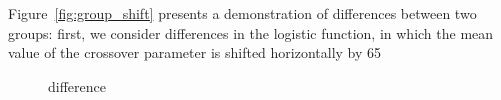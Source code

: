 \documentclass{article}
\begin{document}
Figure~\ref{fig:group_shift} presents a demonstration of differences between two groups: first, we consider differences in the logistic function, in which the mean value of the crossover parameter is shifted horizontally by 65

\begin{figure}[H]
    \centering
    \caption{difference }
\label{fig:difference_between_shift}
\end{figure}
\end{document}
